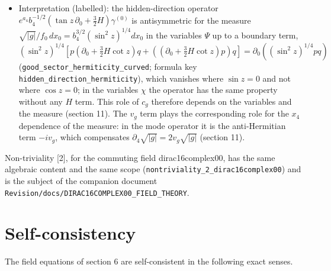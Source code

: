 \documentclass[11pt]{article}
\begin{document}
\begin{itemize}
\item Interpretation (labelled): the hidden-direction operator $e^{a_4}b_4^{-1/2}(\tan z\,\partial_0 + \tfrac32H)\gamma^{(0)}$ is antisymmetric for the measure $\sqrt{|g|}/f_0\,dx_0 = b_4^{3/2}(\sin^2 z)^{1/4}dx_0$ in the variables $\Psi$ up to a boundary term, $(\sin^2 z)^{1/4}[p(\partial_0 + \tfrac32H\cot z)q + ((\partial_0 + \tfrac32H\cot z)p)q] = \partial_0((\sin^2 z)^{1/4}pq)$ (\texttt{good\_sec\allowbreak{}tor\_herm\allowbreak{}iticity\_\allowbreak{}curved}; formula key \texttt{hidden\_d\allowbreak{}irection\allowbreak{}\_hermiti\allowbreak{}city}), which vanishes where $\sin z = 0$ and not where $\cos z = 0$; in the variables $\chi$ the operator has the same property without any $H$ term. This role of $c_g$ therefore depends on the variables and the measure (section 11). The $v_g$ term plays the corresponding role for the $x_4$ dependence of the measure: in the mode operator it is the anti-Hermitian term $-iv_g$, which compensates $\partial_4\sqrt{|g|} = 2v_g\sqrt{|g|}$ (section 11).
\end{itemize}

Non-triviality [2], for the commuting field dirac16complex00, has the same algebraic content and the same scope (\texttt{nontrivi\allowbreak{}ality\_2\_\allowbreak{}dirac16c\allowbreak{}omplex00}) and is the subject of the companion document \texttt{Revision\allowbreak{}/docs/DI\allowbreak{}RAC16COM\allowbreak{}PLEX00\_F\allowbreak{}IELD\_THE\allowbreak{}ORY}.

\section{Self-consistency}

The field equations of section 6 are self-consistent in the following exact senses.
\end{document}
